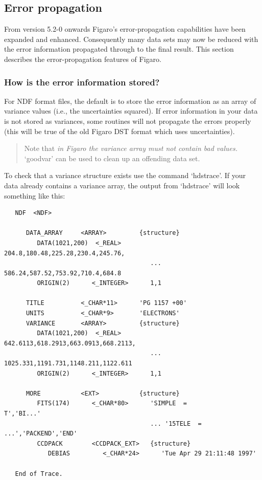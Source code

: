 
\subsection{\label{error_propagation}Error
            propagation}

From version 5.2-0 onwards Figaro's error-propagation capabilities have
been expanded and enhanced.  Consequently many data sets may now be
reduced with the error information propagated through to the final result.
This section describes the error-propagation features of Figaro.

\subsubsection{How is the error information stored?}

For NDF format files, the default is to store the error information as an
array of variance values (i.e., the uncertainties squared).  If error
information in your data is not stored as variances, some routines will
not propagate the errors properly (this will be true of the old Figaro
DST format which uses uncertainties).

\begin{quote}
Note that {\it in Figaro the variance array must not contain bad values.}
`goodvar' can be used to clean up an offending data set.
\end{quote}

To check that a variance structure exists use the command `hdstrace'. If
your data already contains a variance array, the output from `hdstrace' will
look something like this:

{\small
\begin{verbatim}
   NDF  <NDF>

      DATA_ARRAY     <ARRAY>         {structure}
         DATA(1021,200)  <_REAL>        204.8,180.48,225.28,230.4,245.76,
                                        ... 586.24,587.52,753.92,710.4,684.8
         ORIGIN(2)      <_INTEGER>      1,1

      TITLE          <_CHAR*11>      'PG 1157 +00'
      UNITS          <_CHAR*9>       'ELECTRONS'
      VARIANCE       <ARRAY>         {structure}
         DATA(1021,200)  <_REAL>        642.6113,618.2913,663.0913,668.2113,
                                        ... 1025.331,1191.731,1148.211,1122.611
         ORIGIN(2)      <_INTEGER>      1,1

      MORE           <EXT>           {structure}
         FITS(174)      <_CHAR*80>      'SIMPLE  =                    T','BI...'
                                        ... '15TELE  =       ...','PACKEND','END'
         CCDPACK        <CCDPACK_EXT>   {structure}
            DEBIAS         <_CHAR*24>      'Tue Apr 29 21:11:48 1997'

   End of Trace.
\end{verbatim}
}

